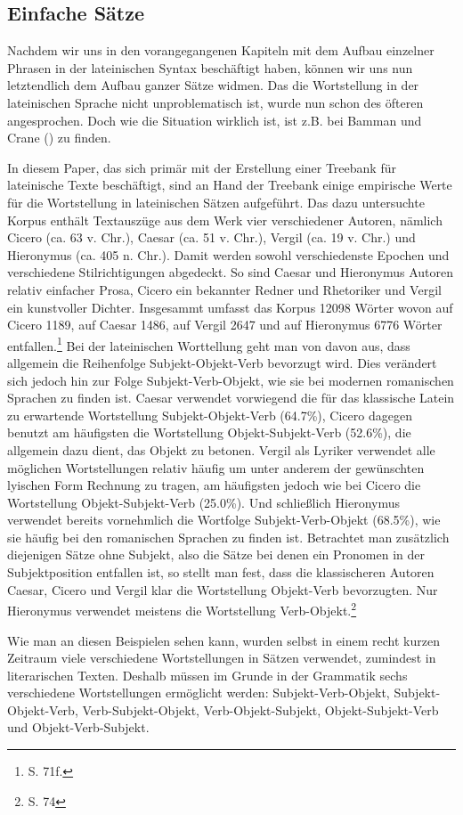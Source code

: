 \documentclass[fontsize=12pt,abstract=on,titlepage,bibliography=totoc,ngerman,listof=totoc]{scrreprt}
\begin{document}
\subsection{Einfache Sätze}
\label{subsec:einfachesaetze}
Nachdem wir uns in den vorangegangenen Kapiteln mit dem Aufbau einzelner Phrasen in der lateinischen Syntax beschäftigt haben, können wir uns nun letztendlich dem Aufbau ganzer Sätze widmen. Das die Wortstellung in der lateinischen Sprache nicht unproblematisch ist, wurde nun schon des öfteren angesprochen. Doch wie die Situation wirklich ist, ist z.B. bei Bamman und Crane (\cite{BAMMAN2006}) zu finden. \par 
In diesem Paper, das sich primär mit der Erstellung einer Treebank für lateinische Texte beschäftigt, sind an Hand der Treebank einige empirische Werte für die Wortstellung in lateinischen Sätzen aufgeführt. Das dazu untersuchte Korpus enthält Textauszüge aus dem Werk vier verschiedener Autoren, nämlich Cicero (ca. 63 v. Chr.), Caesar (ca. 51 v. Chr.), Vergil (ca. 19 v. Chr.) und Hieronymus (ca. 405 n. Chr.). Damit werden sowohl verschiedenste Epochen und verschiedene Stilrichtigungen abgedeckt. So sind Caesar und Hieronymus Autoren relativ einfacher Prosa, Cicero ein bekannter Redner und Rhetoriker und Vergil ein kunstvoller Dichter. Insgesammt umfasst das Korpus 12098 Wörter wovon auf Cicero 1189, auf Caesar 1486, auf Vergil 2647 und auf Hieronymus 6776 Wörter entfallen.\footnote{\cite{BAMMAN2006} S. 71f.} 
Bei der lateinischen Worttellung geht man von davon aus, dass allgemein die Reihenfolge Subjekt-Objekt-Verb bevorzugt wird. Dies verändert sich jedoch hin zur Folge Subjekt-Verb-Objekt, wie sie bei modernen romanischen Sprachen zu finden ist. Caesar verwendet vorwiegend die für das klassische Latein zu erwartende Wortstellung Subjekt-Objekt-Verb (64.7\%), Cicero dagegen benutzt am häufigsten die Wortstellung Objekt-Subjekt-Verb (52.6\%), die allgemein dazu dient, das Objekt zu betonen. Vergil als Lyriker verwendet alle möglichen Wortstellungen relativ häufig um unter anderem der gewünschten lyischen Form Rechnung zu tragen, am häufigsten jedoch wie bei Cicero die Wortstellung Objekt-Subjekt-Verb (25.0\%). Und schließlich Hieronymus verwendet bereits vornehmlich die Wortfolge Subjekt-Verb-Objekt (68.5\%), wie sie häufig bei den romanischen Sprachen zu finden ist. Betrachtet man zusätzlich diejenigen Sätze ohne Subjekt, also die Sätze bei denen ein Pronomen in der Subjektposition entfallen ist, so stellt man fest, dass die klassischeren Autoren Caesar, Cicero und Vergil klar die Wortstellung  Objekt-Verb bevorzugten. Nur Hieronymus verwendet meistens die Wortstellung Verb-Objekt.\footnote{\cite{BAMMAN2006} S. 74} \par
Wie man an diesen Beispielen sehen kann, wurden selbst in einem recht kurzen Zeitraum viele verschiedene Wortstellungen in Sätzen verwendet, zumindest in literarischen Texten. Deshalb müssen im Grunde in der Grammatik sechs verschiedene Wortstellungen ermöglicht werden: Subjekt-Verb-Objekt, Subjekt-Objekt-Verb, Verb-Subjekt-Objekt, Verb-Objekt-Subjekt, Objekt-Subjekt-Verb und Objekt-Verb-Subjekt.
\end{document}
